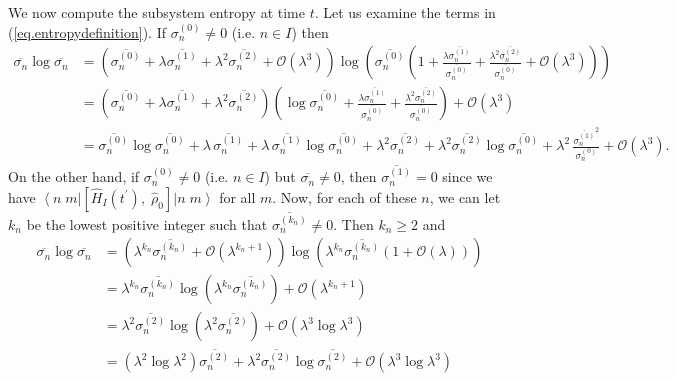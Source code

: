 \documentclass[11pt]{article}
\newcommand{\Od}[1]{\mathcal{O}{\left(#1\right)}}
\newcommand{\bra}[1]{\left\langle#1\right|}
\newcommand{\ket}[1]{\left|#1\right\rangle}
\newcommand{\op}[1]{\hat{#1}}
\newcommand{\bket}[2]{\ket{#1\;#2}}
\newcommand{\bbra}[2]{\bra{#1\;#2}}
\theoremstyle{theorem}
\theoremstyle{remark}
\theoremstyle{step}
\theoremstyle{gap}
\begin{document}
We now compute the subsystem entropy at time \(t\). Let us examine the terms in (\ref{eq.entropydefinition}).
If \(\sigma_{n}^{(0)} \neq 0\) (i.e. \(n \in I\)) then
\begin{align*}
\overline{\sigma_n} \log \overline{\sigma_n}
&= \left(\overline{\sigma_n^{(0)}} + \lambda \overline{\sigma_n^{(1)}} + \lambda^2 \overline{\sigma_n^{(2)}} + \Od{\lambda^{3}}\right) \log \left(\overline{\sigma_n^{(0)}} \left(1 + \frac{\lambda \overline{\sigma_n^{(1)}}}{\overline{\sigma_n^{(0)}}}+ \frac{\lambda^2 \overline{\sigma_n^{(2)}}}{\overline{\sigma_n^{(0)}}} + \Od{\lambda^{3}}\right)\right) \\
&= \left(\overline{\sigma_n^{(0)}} + \lambda \overline{\sigma_n^{(1)}} + \lambda^2 \overline{\sigma_n^{(2)}}\right) \left(\log \overline{\sigma_n^{(0)}} + \frac{\lambda \overline{\sigma_n^{(1)}}}{\overline{\sigma_n^{(0)}}} + \frac{\lambda^2 \overline{\sigma_n^{(2)}}}{\overline{\sigma_n^{(0)}}}\right) + \Od{\lambda^{3}}\\
&=  \overline{\sigma_n^{(0)}} \log \overline{\sigma_n^{(0)}} + \lambda\, \overline{\sigma_n^{(1)}}+\lambda\, \overline{\sigma_n^{(1)}}\log\overline{\sigma_n^{(0)}}+ \lambda^2 \overline{\sigma_n^{(2)}}+ \lambda^2 \overline{\sigma_n^{(2)}}\log\overline{\sigma_n^{(0)}} + \lambda^2\, \frac{\overline{\sigma_n^{(1)}}^2}{\sigma_n^{(0)}}+ \Od{\lambda^{3}}.
\end{align*}
On the other hand, if \(\sigma_{n}^{(0)} \neq 0\) (i.e. \(n \in I\)) but \(\overline{\sigma_n}\neq 0\), then \(\overline{\sigma_n^{(1)}} = 0\) since we have \(\bbra{n}{m} \left[\op{H}_I(t^\prime),\; \op{\rho}_0 \right] \bket{n}{m}\) for all \(m\). Now, for each of these \(n\), we can let \(k_n\) be the lowest positive integer such that \(\overline{\sigma_n^{(k_n)}} \neq 0\). Then \(k_n \geq 2\) and
\begin{align*}
\overline{\sigma_n} \log \overline{\sigma_n}
&= \left(\lambda^{k_n}\overline{\sigma_n^{(k_n)}} + \Od{\lambda^{k_n+1}}\right) \log\left(\lambda^{k_n}\overline{\sigma_n^{(k_n)}}\left(1 + \Od{\lambda}\right)\right) \\
&= \lambda^{k_n}\overline{\sigma_n^{(k_n)}} \log\left(\lambda^{k_n}\overline{\sigma_n^{(k_n)}}\right)+ \Od{\lambda^{k_n+1}}\\
&= \lambda^{2}\overline{\sigma_n^{(2)}} \log\left(\lambda^{2}\overline{\sigma_n^{(2)}}\right)+ \Od{\lambda^{3}\log\lambda^{3}} \\
&= \left(\lambda^{2}\log\lambda^2\right)\overline{\sigma_n^{(2)}} + \lambda^{2}\overline{\sigma_n^{(2)}} \log\overline{\sigma_n^{(2)}}+ \Od{\lambda^{3}\log\lambda^{3}} \\
\end{align*}
\end{document}
